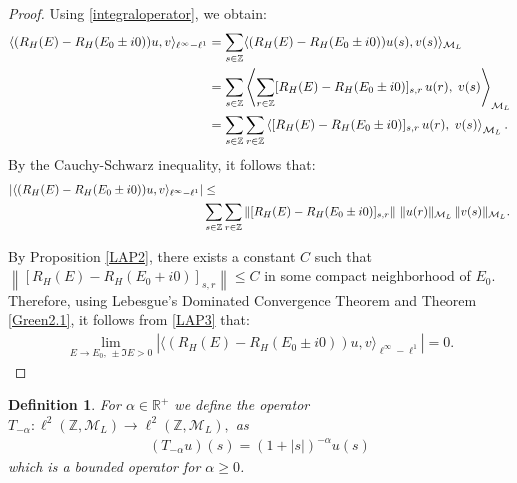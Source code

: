 \documentclass[12pt,oneside,onecolumn,open]{article}
\newtheorem{defi}[teo]{Definition}
\newtheorem{obs}[teo]{Remark}
\begin{document}
\begin{proof}
    Using \eqref{integraloperator}, we obtain:
    \begin{align}
        \langle (R_{H}(E) - R_{H}(E_{0}\pm i0))u, v \rangle _{\ell ^{\infty} - \ell^1} 
        &\notag= \sum_{s \in \mathbb{Z}} \langle (R_{H}(E) - R_{H}(E_{0}\pm i0))u(s), v(s) \rangle _{\mathcal{M}_L} \\
        &\notag= \sum_{s \in \mathbb{Z}} \left\langle \sum_{r \in \mathbb{Z}} [R_{H}(E) - R_{H}(E_{0}\pm i0)]_{s,r} \, u(r),\; v(s) \right\rangle _{\mathcal{M}_L}\\
        &= \sum_{s \in \mathbb{Z}} \sum_{r \in \mathbb{Z}} \left\langle [R_{H}(E) - R_{H}(E_{0}\pm i0)]_{s,r} \, u(r),\; v(s) \right\rangle _{\mathcal{M}_L}.
    \end{align}
    By the Cauchy-Schwarz inequality, it follows that:
    \begin{align}\label{LAP3}\notag
        \left| \langle (R_{H}(E) - R_{H}(E_{0}\pm  i0))u, v \rangle _{\ell ^{\infty} - \ell^1}\right| 
        &\leq \\  &\sum_{s \in \mathbb{Z}} \sum_{r \in \mathbb{Z}} 
        \left\| [R_{H}(E) - R_{H}(E_{0}\pm i0)]_{s,r} \right\| \,
        \| u(r) \|_{\mathcal{M}_{L}} \, \| v(s) \|_{\mathcal{M}_{L}}.
    \end{align}
    
    By Proposition \ref{LAP2}, there exists a constant $C$ such that $\left\| [R_{H}(E) - R_{H}(E_{0}+i0)]_{s,r} \right\| \leq C$ in some compact neighborhood of $E_0$. Therefore, using Lebesgue's Dominated Convergence Theorem and Theorem \ref{Green2.1}, it follows from \eqref{LAP3} that:
    \begin{align}
       \lim_{E \to E_{0},\, \pm \Im E > 0}  \left| \langle (R_{H}(E) - R_{H}(E_{0}\pm i0))u, v \rangle _{\ell ^{\infty} - \ell^1}\right| = 0.
    \end{align}
\end{proof}





\begin{defi}\label{sigma}
 For \(\alpha \in\mathbb{R}^{+}\) we define the operator 
$T_{-\alpha }:\ell ^{2}(\mathbb{Z},\mathcal{M}_L)\to \ell ^{2}(\mathbb{Z},\mathcal{M}_L),$
as
\begin{align}
   ( T_{-\alpha }u)(s)=(1+|s|)^{-\alpha}u(s)
\end{align}
which is a bounded operator for $\alpha \geq 0$. 
\end{defi}
\end{document}
